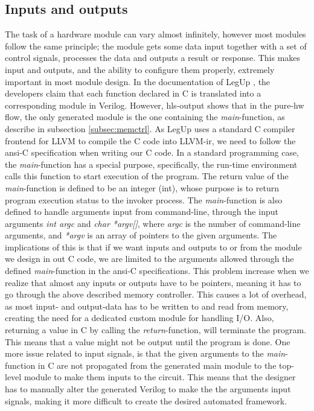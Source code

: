\subsection{\label{subsec:inoutprobs}Inputs and outputs}
The task of a hardware module can vary almost infinitely, however most modules follow the same principle; the module gets some data input together with a set of control signals, processes the data and outputs a result or response. This makes input and outputs, and the ability to configure them properly, extremely important in most module design. In the documentation of LegUp \cite{leguparch}, the developers claim that each function declared in C is translated into a corresponding module in Verilog. However, \gls{hls}-output shows that in the pure-\gls{hw} flow, the only generated module is the one containing the \textit{main}-function, as describe in subsection \ref{subsec:memctrl}. As LegUp uses a standard C compiler frontend for LLVM to compile the C code into LLVM-\gls{ir}, we need to follow the \gls{ansi}-C specification \cite{isoc} when writing our C code. In a standard programming case, the \textit{main}-function has a special purpose, specifically, the run-time environment calls this function to start execution of the program. The return value of the \textit{main}-function is defined to be an integer (int), whose purpose is to return program execution status to the invoker process. The \textit{main}-function is also defined to handle arguments input from command-line, through the input arguments \textit{int argc} and \textit{char *argv[]}, where \textit{argc} is the number of command-line arguments, and \textit{*argv} is an array of pointers to the given arguments. The implications of this is that if we want inputs and outputs to or from the module we design in out C code, we are limited to the arguments allowed through the defined \textit{main}-function in the \gls{ansi}-C specifications. This problem increase when we realize that almost any inputs or outputs have to be pointers, meaning it has to go through the above described memory controller. This causes a lot of overhead, as most input- and output-data has to be written to and read from memory, creating the need for a dedicated custom module for handling I/O. Also, returning a value in C by calling the \textit{return}-function, will terminate the program. This means that a value might not be output until the program is done. One more issue related to input signals, is that the given arguments to the \textit{main}-function in C are not propagated from the generated main module to the top-level module to make them inputs to the circuit. This means that the designer has to manually alter the generated Verilog to make the the arguments input signals, making it more difficult to create the desired automated framework.


